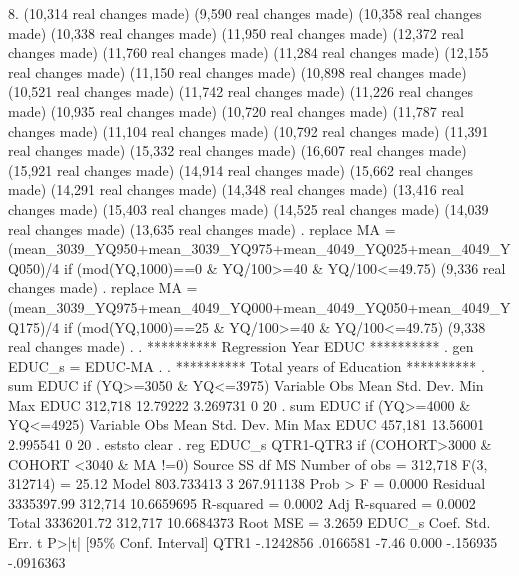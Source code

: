  8. {\rbr}
(10,314 real changes made)
(9,590 real changes made)
(10,358 real changes made)
(10,338 real changes made)
(11,950 real changes made)
(12,372 real changes made)
(11,760 real changes made)
(11,284 real changes made)
(12,155 real changes made)
(11,150 real changes made)
(10,898 real changes made)
(10,521 real changes made)
(11,742 real changes made)
(11,226 real changes made)
(10,935 real changes made)
(10,720 real changes made)
(11,787 real changes made)
(11,104 real changes made)
(10,792 real changes made)
(11,391 real changes made)
(15,332 real changes made)
(16,607 real changes made)
(15,921 real changes made)
(14,914 real changes made)
(15,662 real changes made)
(14,291 real changes made)
(14,348 real changes made)
(13,416 real changes made)
(15,403 real changes made)
(14,525 real changes made)
(14,039 real changes made)
(13,635 real changes made)
{\smallskip}
. replace MA = (mean_3039_YQ950+mean_3039_YQ975+mean_4049_YQ025+mean_4049_YQ050)/4 if (mod(YQ,1000)==0 \& YQ/100>=40 \& YQ/100<=49.75)
(9,336 real changes made)
{\smallskip}
. replace MA = (mean_3039_YQ975+mean_4049_YQ000+mean_4049_YQ050+mean_4049_YQ175)/4 if (mod(YQ,1000)==25 \& YQ/100>=40 \& YQ/100<=49.75)
(9,338 real changes made)
{\smallskip}
. 
. **********  Regression Year EDUC **********
. gen EDUC_s = EDUC-MA
{\smallskip}
. 
. **********  Total years of Education **********
. sum EDUC if (YQ>=3050 \& YQ<=3975)
{\smallskip}
    Variable {\VBAR}        Obs        Mean    Std. Dev.       Min        Max
        EDUC {\VBAR}    312,718    12.79222    3.269731          0         20
{\smallskip}
. sum EDUC if (YQ>=4000 \& YQ<=4925)
{\smallskip}
    Variable {\VBAR}        Obs        Mean    Std. Dev.       Min        Max
        EDUC {\VBAR}    457,181    13.56001    2.995541          0         20
{\smallskip}
. eststo clear
{\smallskip}
. reg EDUC_s QTR1-QTR3  if (COHORT>3000 \& COHORT <3040 \& MA !=0)
{\smallskip}
      Source {\VBAR}       SS           df       MS      Number of obs   =   312,718
   F(3, 312714)    =     25.12
       Model {\VBAR}  803.733413         3  267.911138   Prob > F        =    0.0000
    Residual {\VBAR}  3335397.99   312,714  10.6659695   R-squared       =    0.0002
   Adj R-squared   =    0.0002
       Total {\VBAR}  3336201.72   312,717  10.6684373   Root MSE        =    3.2659
{\smallskip}
      EDUC_s {\VBAR}      Coef.   Std. Err.      t    P>|t|     [95\% Conf. Interval]
        QTR1 {\VBAR}  -.1242856   .0166581    -7.46   0.000     -.156935   -.0916363
